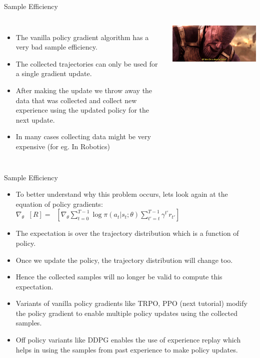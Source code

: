 \begin{frame}{Sample Efficiency}
    \begin{columns}
        \begin{itemize}
            \item The vanilla policy gradient algorithm has a very bad sample efficiency.
            \item The collected trajectories can only be used for a single gradient update.
            \item After making the update we throw away the data that was collected and collect new experience using the updated policy for the next update.
            \item In many cases collecting data might be very expensive (for eg. In Robotics)
        \end{itemize}
        \includegraphics[scale = 0.35]{img/thanos.png}
    \end{columns}
\end{frame}
\begin{frame}{Sample Efficiency}
\begin{itemize}
    \item To better understand why this problem occurs, lets look again at the equation of policy gradients: $\nabla_\theta \mathop{\mathbb{E}_\tau}[R] = \mathop{\mathbb{E}_\tau}[ \nabla_\theta \sum_{t=0}^{T-1}\log\pi(a_t|s_t;\theta)\sum_{t' = t}^{T-1} \gamma^{t'} r_{t'}]$
    \item The expectation is over the trajectory distribution which is a function of policy. 
    \item Once we update the policy, the trajectory distribution will change too.
    \item Hence the collected samples will no longer be valid to compute this expectation.
    \item Variants of vanilla policy gradients like TRPO, PPO (next tutorial) modify the policy gradient to enable multiple policy updates using the collected samples.
    \item Off policy variants like DDPG enables the use of experience replay which helps in using the samples from past experience to make policy updates.
\end{itemize}
\end{frame}